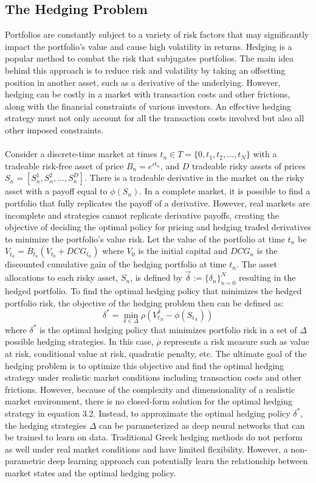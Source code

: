 \subsection{The Hedging Problem}

Portfolios are constantly subject to a variety of risk factors that may significantly impact the portfolio's value and cause high volatility in returns. Hedging is a popular method to combat the risk that subjugates portfolios. The main idea behind this approach is to reduce risk and volatility by taking an offsetting position in another asset, such as a derivative of the underlying. However, hedging can be costly in a market with transaction costs and other frictions, along with the financial constraints of various investors. An effective hedging strategy must not only account for all the transaction costs involved but also all other imposed constraints.
\\ \\
Consider a discrete-time market at times $t_n \in T = \{0, t_1, t_2,..., t_N\}$ with a tradeable risk-free asset of price $B_n = e^{rt_n}$, and $D$ tradeable risky assets of prices $S_n = [S_n^1, S_n^2,..., S_n^D]$. There is a tradeable derivative in the market on the risky asset with a payoff equal to $\phi(S_n)$. In a complete market, it is possible to find a portfolio that fully replicates the payoff of a derivative. However, real markets are incomplete and strategies cannot replicate derivative payoffs, creating the objective of deciding the optimal policy for pricing and hedging traded derivatives to minimize the portfolio's value risk. Let the value of the portfolio at time $t_n$ be $V_{t_n}=B_{t_n}(V_{t_0}+DCG_{t_n})$ where $V_0$ is the initial capital and $DCG_n$ is the discounted cumulative gain of the hedging portfolio at time $t_n$. The asset allocations to each risky asset, $S_n$, is defined by $\vec\delta:=\{\delta_n\}^N_{n=0}$ resulting in the hedged portfolio. To find the optimal hedging policy that minimizes the hedged portfolio risk, the objective of the hedging problem then can be defined as:
\begin{equation}
    \delta^* = \min_{\delta \in \Delta}{\rho(V_{t_N}^\delta-\phi(S_{t_N}))}
\end{equation}
\noindent where $\delta^*$ is the optimal hedging policy that minimizes portfolio risk in a set of $\Delta$ possible hedging strategies. In this case, $\rho$ represents a risk measure such as value at risk, conditional value at risk, quadratic penalty, etc. The ultimate goal of the hedging problem is to optimize this objective and find the optimal hedging strategy under realistic market conditions including transaction costs and other frictions. However, because of the complexity and dimensionality of a realistic market environment, there is no closed-form solution for the optimal hedging strategy in equation 3.2. Instead, to approximate the optimal hedging policy $\delta^*$, the hedging strategies $\Delta$ can be parameterized as deep neural networks that can be trained to learn on data. Traditional Greek hedging methods do not perform as well under real market conditions and have limited flexibility. However, a non-parametric deep learning approach can potentially learn the relationship between market states and the optimal hedging policy.

